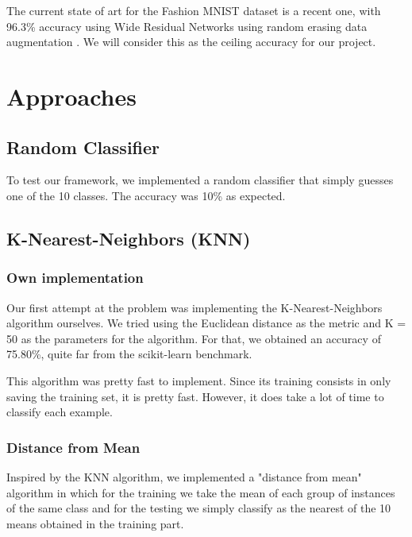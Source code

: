 \documentclass{article}
\begin{document}
The current state of art for the Fashion MNIST dataset is a recent one, with 96.3\% accuracy using Wide
Residual Networks using random erasing data augmentation \cite{randomerasingdataaugmentationpaper}.
We will consider this as the ceiling accuracy for our project.


\section{Approaches}

\subsection{Random Classifier}

To test our framework, we implemented a random classifier that simply guesses one of the 10 classes. The accuracy was 10\% as expected.

\subsection{K-Nearest-Neighbors (KNN)}

\subsubsection{Own implementation}

Our first attempt at the problem was implementing the K-Nearest-Neighbors algorithm ourselves.
We tried using the Euclidean distance as the metric and K = 50 as the parameters for the algorithm.
For that, we obtained an accuracy of 75.80\%, quite far from the scikit-learn benchmark.

This algorithm was pretty fast to implement.
Since its training consists in only saving the training set, it is pretty fast.
However, it does take a lot of time to classify each example.

\subsubsection{Distance from Mean}

Inspired by the KNN algorithm, we implemented a "distance from mean" algorithm in which for the training we
take the mean of each group of instances of the same class and for the testing we simply classify as the nearest
of the 10 means obtained in the training part.
\end{document}
